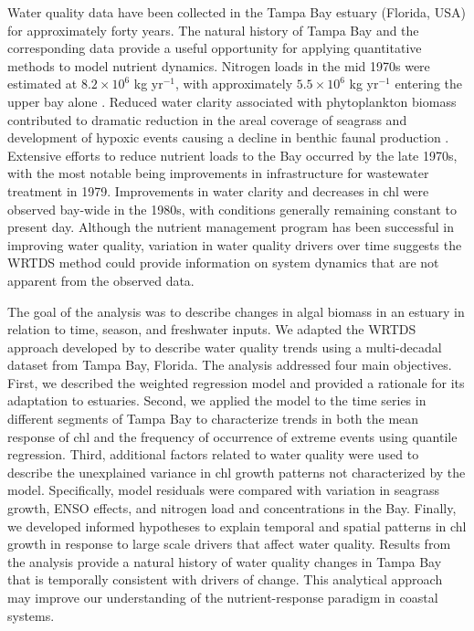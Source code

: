 \documentclass[letterpaper,12pt,oneside]{article}\usepackage[]{graphicx}\usepackage[]{color}
\begin{document}
Water quality data have been collected in the Tampa Bay estuary (Florida, USA) for approximately forty years.  The natural history of Tampa Bay and the corresponding data provide a useful opportunity for applying quantitative methods to model nutrient dynamics. Nitrogen loads in the mid 1970s were estimated at $8.2 \times 10^6$ kg yr$^{-1}$, with approximately $5.5 \times 10^6$ kg yr$^{-1}$ entering the upper bay alone \citep{Poe05,Greening06}.  Reduced water clarity associated with phytoplankton biomass contributed to dramatic reduction in the areal coverage of seagrass \citep{Tomasko05} and development of hypoxic events causing a decline in benthic faunal production \citep{Santos80}.  Extensive efforts to reduce nutrient loads to the Bay occurred by the late 1970s, with the most notable being improvements in infrastructure for wastewater treatment in 1979.  Improvements in water clarity and decreases in \ac{chl} were observed bay-wide in the 1980s, with conditions generally remaining constant to present day. Although the nutrient management program has been successful in improving water quality, variation in water quality drivers over time suggests the \ac{WRTDS} method could provide information on system dynamics that are not apparent from the observed data.

The goal of the analysis was to describe changes in algal biomass in an estuary in relation to time, season, and freshwater inputs.  We adapted the \ac{WRTDS} approach developed by \citet{Hirsch10} to describe water quality trends using a multi-decadal dataset from Tampa Bay, Florida. The analysis addressed four main objectives.  First, we described the weighted regression model and provided a rationale for its adaptation to estuaries.  Second, we applied the model to the time series in different segments of Tampa Bay to characterize trends in both the mean response of \ac{chl} and the frequency of occurrence of extreme events using quantile regression.  Third, additional factors related to water quality were used to describe the unexplained variance in \ac{chl} growth patterns not characterized by the model.  Specifically, model residuals were compared with variation in seagrass growth, \ac{ENSO} effects, and nitrogen load and concentrations in the Bay.  Finally, we developed informed hypotheses to explain temporal and spatial patterns in \ac{chl} growth in response to large scale drivers that affect water quality.  Results from the analysis provide a natural history of water quality changes in Tampa Bay that is temporally consistent with drivers of change.  This analytical approach may improve our understanding of the nutrient-response paradigm in coastal systems.  
\end{document}
